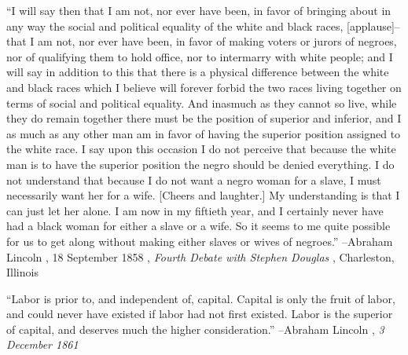 \documentclass{article}%
\begin{document}
\linebreak%
\vspace{1mm}%
\begin{minipage}{\textwidth}%
\flushleft%
“I will say then that I am not, nor ever have been, in favor of bringing about in any way the social and political equality of the white and black races,  {[}applause{]}–that I am not, nor ever have been, in favor of making voters or  jurors of negroes, nor of qualifying them to hold office, nor to intermarry with  white people; and I will say in addition to this that there is a physical difference  between the white and black races which I believe will forever forbid the two races  living together on terms of social and political equality. And inasmuch as they  cannot so live, while they do remain together there must be the position of superior and inferior, and I as much as any other man am in favor of having the superior position assigned to the white race. I say upon this occasion I do not perceive that because the white man is to have the superior position the negro should be denied everything. I do not understand that because I do not want a negro woman for a slave, I must necessarily want her for a wife. {[}Cheers and laughter.{]} My understanding is that I can just let her alone. I am now in my fiftieth year, and I certainly never have had a black woman for either a slave or a wife. So it seems to me quite possible for us to get along without making either slaves or wives of negroes.”%
\linebreak%
\vspace{1mm}%
–Abraham Lincoln%
, 18 September 1858%
, \textit{Fourth Debate with Stephen Douglas}%
, Charleston, Illinois%
\linebreak%
\vspace{1mm}%
\end{minipage}%
\linebreak%
\vspace{1mm}%
\begin{minipage}{\textwidth}%
\flushleft%
“Labor is prior to, and independent of, capital. Capital is only the fruit of labor, and could never have existed if labor had not first existed. Labor is the superior of capital, and deserves much the higher consideration.”%
\linebreak%
\vspace{1mm}%
–Abraham Lincoln%
, \textit{3 December 1861}%
\linebreak%
\vspace{1mm}%
\end{minipage}%
\end{document}
